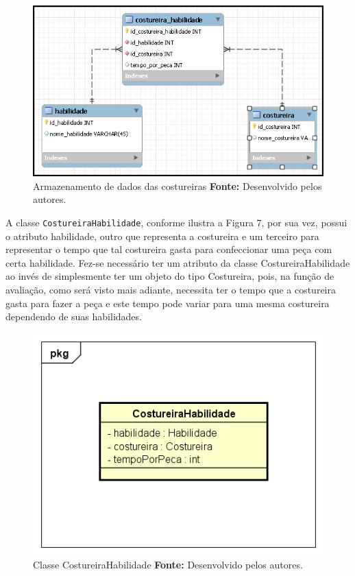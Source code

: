 \newpage

\begin{figure}[h!]
	\centerline{\includegraphics[scale=0.9]{./imagens/costureira_habilidade_tabela.png}}
	\caption[Tabela costureira-habilidade]
	{Armazenamento de dados das costureiras \textbf{Fonte:} Desenvolvido pelos
	autores.}
	\label{fig:exemplo1}
\end{figure}


\par A classe \texttt{CostureiraHabilidade}, conforme ilustra a Figura 7, por
sua vez, possui o atributo habilidade, outro que
representa a costureira e um terceiro para representar o tempo que tal
costureira gasta para confeccionar uma peça com certa habilidade. Fez-se
necessário ter um atributo da classe CostureiraHabilidade ao invés de simplesmente ter um objeto do tipo Costureira, pois, 
na função de avaliação, como será visto mais adiante, necessita ter o tempo
que a costureira gasta para fazer a peça e este tempo pode variar para uma mesma costureira dependendo de suas habilidades.

\begin{figure}[h!]
	\centerline{\includegraphics[scale=0.9]{./imagens/costureiraHabilidade_class.png}}
	\caption[Classe CostureiraHabilidade]
	{Classe CostureiraHabilidade \textbf{Fonte:} Desenvolvido pelos autores.}
	\label{fig:exemplo1}
\end{figure}

